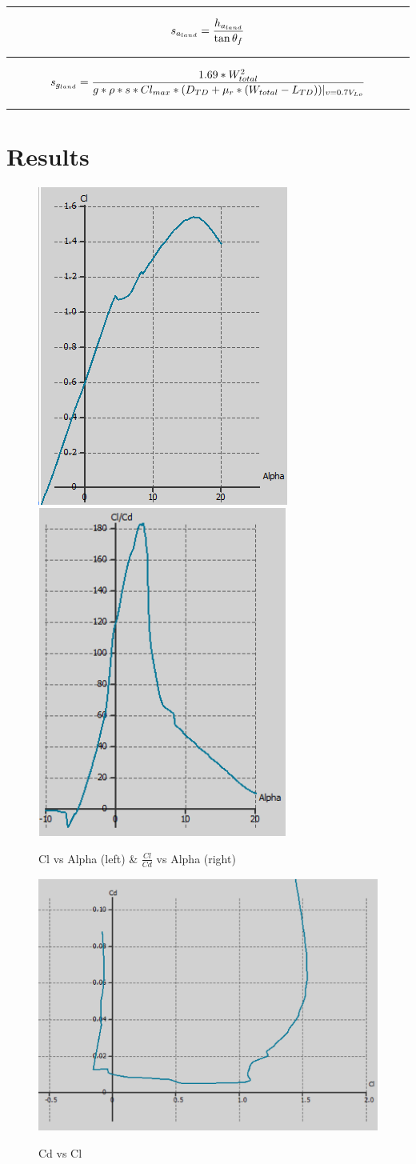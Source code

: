 \documentclass[12pt,A4paper]{article}
\begin{document}
		\hrule
		\vspace{0.1 in}
		\begin{equation}
			s_{a_{land}} = \frac{h_{a_{land}}}{\tan{\theta_f}}\\
		\end{equation}
		\hrule
		\vspace{0.1 in}
		\begin{equation}
			s_{g_{land}} = \frac{1.69*W_{total}^2}{g*\rho*s*Cl_{max}*(D_{TD} + \mu_r * (W_{total} - L_{TD}))|_{v= 0.7V_{Lo}}}\\
		\end{equation}
		\hrule
		\vspace{0.1 in}
	\clearpage
	\section{Results}
	\begin{figure}[!h]
		\centering
		\includegraphics[width=.39\textwidth]{ClAlpha.png}\hspace{0.02 in} \label{fig:f2}
		\includegraphics[width=.375\textwidth]{ClCdAlpha.png} \label{fig:f3}
		\caption{Cl vs Alpha (left) \& $\frac{Cl}{Cd}$ vs Alpha (right)}
	\end{figure}
	\begin{figure}[!h]
		\centering
		\includegraphics[width=.6\textwidth]{CdCl.png} \label{fig:f4}
		\caption{Cd vs Cl}
	\end{figure}
\end{document}
